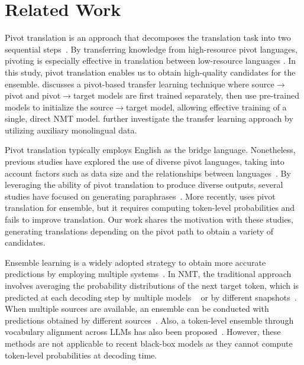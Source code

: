 \section{Related Work}


Pivot translation is an approach that decomposes the translation task into two sequential steps~\cite{wu-wang-2007-pivot, utiyama-isahara-2007-comparison}.
By transferring knowledge from high-resource pivot languages, pivoting is especially effective in translation between low-resource languages \cite{zoph-etal-2016-transfer, aji-etal-2020-neural, he-etal-2022-tencent}.
In this study, pivot translation enables us to obtain high-quality candidates for the ensemble.
\citet{kim-etal-2019-pivot} discusses a pivot-based transfer learning technique where source$\rightarrow$pivot and pivot$\rightarrow$target models are first trained separately, then use pre-trained models to initialize the source$\rightarrow$target model, allowing effective training of a single, direct NMT model.
\citet{zhang-etal-2022-triangular} further investigate the transfer learning approach by utilizing auxiliary monolingual data.


Pivot translation typically employs English as the bridge language.
Nonetheless, previous studies have explored the use of diverse pivot languages, taking into account factors such as data size and the relationships between languages~\cite{paul2009importance, dabre-etal-2015-leveraging}.
By leveraging the ability of pivot translation to produce diverse outputs, several studies have focused on generating paraphrases~\cite{mallinson-etal-2017-paraphrasing, guo2019zeroshot}.
More recently, \citet{mohammadshahi-etal-2024-investigating} uses pivot translation for ensemble, but it requires computing token-level probabilities and fails to improve translation.
Our work shares the motivation with these studies, generating translations depending on the pivot path to obtain a variety of candidates.


Ensemble learning is a widely adopted strategy to obtain more accurate predictions by employing multiple systems~\cite{sagi2018ensemble}.
In NMT, the traditional approach involves averaging the probability distributions of the next target token, which is predicted at each decoding step by multiple models ~\cite{bojar-etal-2014-findings} or by different snapshots~\cite{huang2017snapshot}.
When multiple sources are available, an ensemble can be conducted with predictions obtained by different sources~\cite {firat-etal-2016-zero}.
Also, a token-level ensemble through vocabulary alignment across LLMs has also been proposed~\cite{eva}.
However, these methods are not applicable to recent black-box models as they cannot compute token-level probabilities at decoding time.


